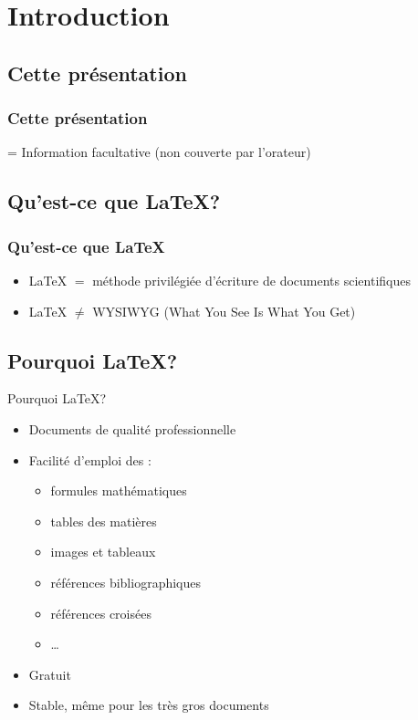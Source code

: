 \section{Introduction}
\subsection{Cette présentation}
\begin{frame}
  \frametitle{Cette présentation}
  \begin{center}
    \Warning = Information facultative (non couverte par l'orateur)
  \end{center}
\end{frame}
\subsection{Qu'est-ce que \LaTeX{}?}

\begin{frame}
\frametitle{Qu'est-ce que \LaTeX}
\begin{itemize}
\item \LaTeX{} $=$ méthode privilégiée d'écriture de documents scientifiques
 \vspace{0.5cm}
\item \LaTeX{} $ \neq$ WYSIWYG (What You See Is What You Get)
\end{itemize}
\end{frame}

\subsection{Pourquoi \LaTeX{}?}

\begin{frame}{Pourquoi \LaTeX{}?}
  \begin{itemize}
      \item Documents de qualité professionnelle
    \item Facilité d'emploi des :
    \begin{itemize}
        \item formules mathématiques
        \item tables des matières
        \item images et tableaux
        \item références bibliographiques
        \item références croisées
        \item \ldots{}
    \end{itemize}
    \item Gratuit
    \item Stable, même pour les très gros documents
  \end{itemize}
\end{frame}


